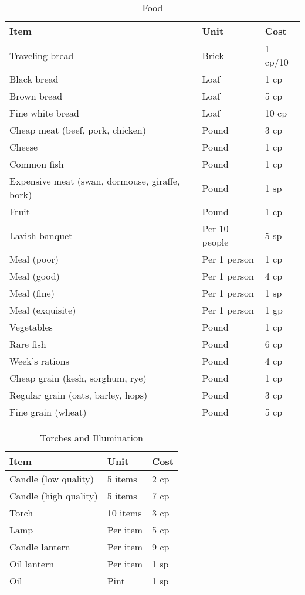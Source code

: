 \documentclass[oneside,11pt,english]{book}
\begin{document}
\begin{table}[hb]
	\centering
	\caption{Food}
	\label{tab:Food}
	\begin{tabu} spread 0pt {*{3}{X[-1]}}
		Item &Unit &Cost\\\toprule
Traveling bread &Brick &1 cp/10\\
Black bread &Loaf &1 cp\\
Brown bread &Loaf &5 cp\\
Fine white bread &Loaf &10 cp\\
Cheap meat (beef, pork, chicken) &Pound &3 cp\\
Cheese &Pound &1 cp\\
Common fish &Pound &1 cp\\
Expensive meat (swan, dormouse, giraffe, bork) &Pound &1 sp\\
Fruit &Pound &1 cp\\
Lavish banquet &Per 10 people &5 sp\\
Meal (poor) &Per 1 person &1 cp\\
Meal (good) &Per 1 person &4 cp\\
Meal (fine) &Per 1 person &1 sp\\
Meal (exquisite) &Per 1 person &1 gp\\
Vegetables &Pound &1 cp\\
Rare fish &Pound &6 cp\\
Week's rations &Pound &4 cp\\
Cheap grain (kesh, sorghum, rye) &Pound &1 cp\\
Regular grain (oats, barley, hops) &Pound &3 cp\\
Fine grain (wheat) &Pound &5 cp\\
	\end{tabu}
\end{table}

\begin{table}[hb]
	\centering
	\caption{Torches and Illumination}
	\label{tab:Torches and Illumination}
	\begin{tabu} spread 0pt {*{3}{X[-1]}}
		Item &Unit &Cost\\\toprule
Candle (low quality) &5 items &2 cp\\
Candle (high quality) &5 items &7 cp\\
Torch &10 items &3 cp\\
Lamp &Per item &5 cp\\
Candle lantern &Per item &9 cp\\
Oil lantern &Per item &1 sp\\
Oil &Pint &1 sp\\
	\end{tabu}
\end{table}
\end{document}
